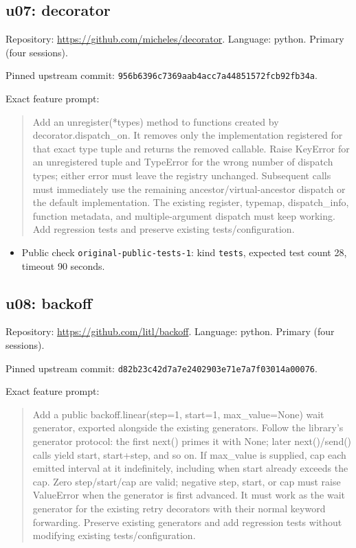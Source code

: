 \documentclass[manuscript,screen,nonacm]{acmart}
\providecommand{\tightlist}{\setlength{\itemsep}{0pt}\setlength{\parskip}{0pt}}
\begin{document}
\subsection{u07: decorator}\label{u07-decorator}

Repository: \url{https://github.com/micheles/decorator}. Language:
python. Primary (four sessions).

Pinned upstream commit:
\nolinkurl{956b6396c7369aab4acc7a44851572fcb92fb34a}.

Exact feature prompt:

\begin{quote}
Add an unregister(*types) method to functions created by
decorator.dispatch\_on. It removes only the implementation registered
for that exact type tuple and returns the removed callable. Raise
KeyError for an unregistered tuple and TypeError for the wrong number of
dispatch types; either error must leave the registry unchanged.
Subsequent calls must immediately use the remaining
ancestor/virtual-ancestor dispatch or the default implementation. The
existing register, typemap, dispatch\_info, function metadata, and
multiple-argument dispatch must keep working. Add regression tests and
preserve existing tests/configuration.
\end{quote}

\begin{itemize}
\tightlist
\item
  Public check \nolinkurl{original-public-tests-1}: kind \texttt{tests},
  expected test count 28, timeout 90 seconds.
\end{itemize}

\subsection{u08: backoff}\label{u08-backoff}

Repository: \url{https://github.com/litl/backoff}. Language: python.
Primary (four sessions).

Pinned upstream commit:
\nolinkurl{d82b23c42d7a7e2402903e71e7a7f03014a00076}.

Exact feature prompt:

\begin{quote}
Add a public backoff.linear(step=1, start=1, max\_value=None) wait
generator, exported alongside the existing generators. Follow the
library's generator protocol: the first next() primes it with None;
later next()/send() calls yield start, start+step, and so on. If
max\_value is supplied, cap each emitted interval at it indefinitely,
including when start already exceeds the cap. Zero step/start/cap are
valid; negative step, start, or cap must raise ValueError when the
generator is first advanced. It must work as the wait generator for the
existing retry decorators with their normal keyword forwarding. Preserve
existing generators and add regression tests without modifying existing
tests/configuration.
\end{quote}
\end{document}
